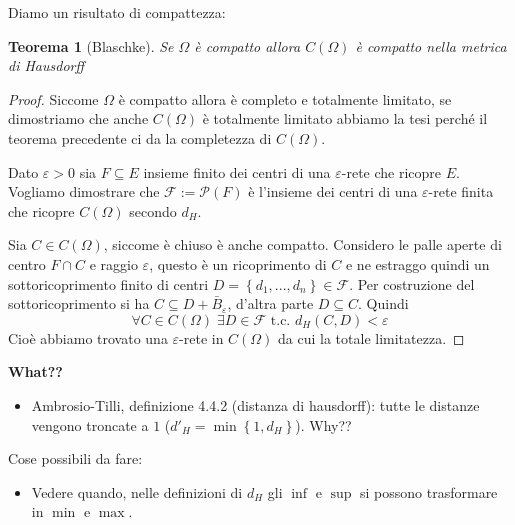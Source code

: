 \documentclass[a4paper,10pt]{article}
\theoremstyle{plain}
\newtheorem{myteo}{Teorema}[section]
\theoremstyle{definition}
\theoremstyle{remark}
\newcommand{\set}[1]{\left\{#1\right\}}
\begin{document}
Diamo un risultato di compattezza:
\begin{myteo}[Blaschke{\cite[Teorema 4.4.6]{ambrosio2000selected}}]
  Se $\Omega$ è compatto allora $C(\Omega)$ è compatto nella metrica
  di Hausdorff
\end{myteo}
\begin{proof}
  Siccome $\Omega$ è compatto allora è completo e totalmente limitato,
  se dimostriamo che anche $C(\Omega)$ è totalmente limitato abbiamo
  la tesi perché il teorema precedente ci da la completezza di
  $C(\Omega)$.

  Dato $\varepsilon >0$ sia $F\subseteq E$ insieme finito dei centri di
  una $\varepsilon$-rete che ricopre $E$. Vogliamo dimostrare che
  $\mathcal{F}:= \mathcal{P}(F)$ è l'insieme dei centri di una
  $\varepsilon$-rete finita che ricopre $C(\Omega)$ secondo $d_H$.

  Sia $C\in C(\Omega)$, siccome è chiuso è anche compatto. Considero
  le palle aperte di centro $F\cap C$ e raggio $\varepsilon$, questo è
  un ricoprimento di $C$ e ne estraggo quindi un sottoricoprimento
  finito di centri $D=\set{d_1,...,d_n} \in \mathcal{F}$. Per
  costruzione del sottoricoprimento si ha $C \subseteq D +
  \bar B_\varepsilon$, d'altra parte $D \subseteq C$. Quindi
  \[ \forall C \in C(\Omega)\; \exists D \in \mathcal{F}\text{ t.c. }
  d_H(C,D) < \varepsilon \]
  Cioè abbiamo trovato una $\varepsilon$-rete in $C(\Omega)$ da cui la
  totale limitatezza.
\end{proof}









\newpage





\newpage

\textbf{What??}

\begin{itemize}
\item Ambrosio-Tilli, definizione 4.4.2 (distanza di hausdorff): tutte le
  distanze vengono troncate a $1$ ($d'_H = \min\set{1,d_H}$). Why??
\end{itemize}


\newpage

Cose possibili da fare:

\begin{itemize}
\item Vedere quando, nelle definizioni di $d_H$ gli $\inf$ e $\sup$ si
  possono trasformare in $\min$ e $\max$.
\end{itemize}
\end{document}
